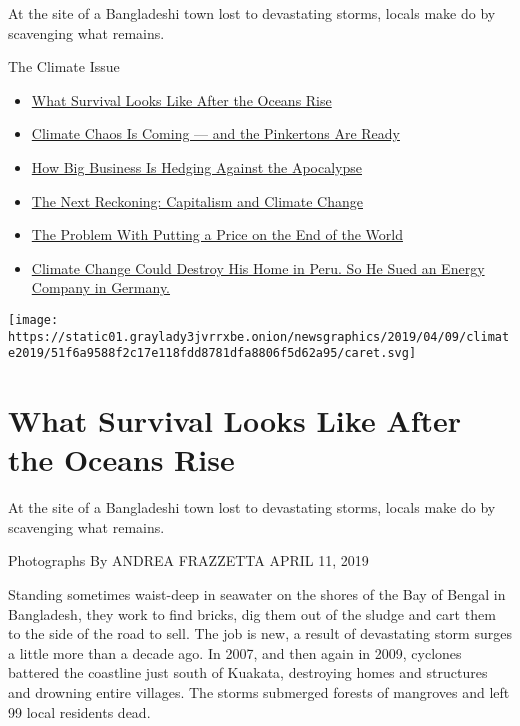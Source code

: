 At the site of a Bangladeshi town lost to devastating storms, locals
make do by scavenging what remains.

The Climate Issue

\begin{itemize}
\tightlist
\item
  \href{https://www.nytimes3xbfgragh.onion/interactive/2019/04/11/magazine/climate-change-bangladesh-scavenging.html}{What
  Survival Looks Like After the Oceans Rise}
\item
  \href{https://www.nytimes3xbfgragh.onion/interactive/2019/04/10/magazine/climate-change-pinkertons.html}{Climate
  Chaos Is Coming --- and the Pinkertons Are Ready}
\item
  \href{https://www.nytimes3xbfgragh.onion/interactive/2019/04/11/magazine/climate-change-exxon-renewable-energy.html}{How
  Big Business Is Hedging Against the Apocalypse}
\item
  \href{https://www.nytimes3xbfgragh.onion/interactive/2019/04/09/magazine/climate-change-capitalism.html}{The
  Next Reckoning: Capitalism and Climate Change}
\item
  \href{https://www.nytimes3xbfgragh.onion/interactive/2019/04/09/magazine/climate-change-politics-economics.html}{The
  Problem With Putting a Price on the End of the World}
\item
  \href{https://www.nytimes3xbfgragh.onion/interactive/2019/04/09/magazine/climate-change-peru-law.html}{Climate
  Change Could Destroy His Home in Peru. So He Sued an Energy Company in
  Germany.}
\end{itemize}

\protect\hyperlink{}{} \protect\hyperlink{}{}

\texttt{[image: https://static01.graylady3jvrrxbe.onion/newsgraphics/2019/04/09/climate2019/51f6a9588f2c17e118fdd8781dfa8806f5d62a95/caret.svg]}

\hypertarget{what-survival-looks-like-after-the-oceans-rise-1}{%
\section{What Survival Looks Like After the Oceans
Rise}\label{what-survival-looks-like-after-the-oceans-rise-1}}

At the site of a Bangladeshi town lost to devastating storms, locals
make do by scavenging what remains.

Photographs By ANDREA FRAZZETTA APRIL 11, 2019

Standing sometimes waist-deep in seawater on the shores of the Bay of
Bengal in Bangladesh, they work to find bricks, dig them out of the
sludge and cart them to the side of the road to sell. The job is new, a
result of devastating storm surges a little more than a decade ago. In
2007, and then again in 2009, cyclones battered the coastline just south
of Kuakata, destroying homes and structures and drowning entire
villages. The storms submerged forests of mangroves and left 99 local
residents dead.

